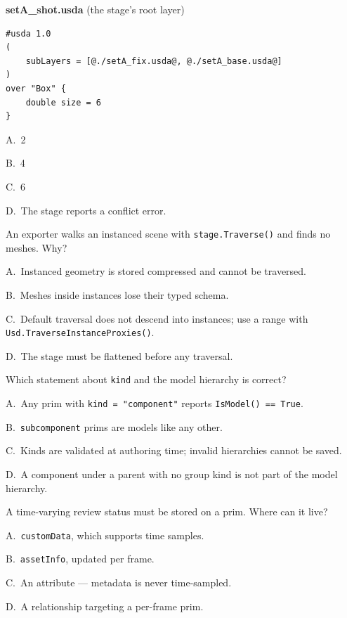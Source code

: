 \noindent\textbf{setA\_shot.usda} (the stage's root layer)
\begin{lstlisting}
#usda 1.0
(
    subLayers = [@./setA_fix.usda@, @./setA_base.usda@]
)
over "Box" {
    double size = 6
}
\end{lstlisting}

\begin{Choices}
  \item A.\ 2
  \item B.\ 4
  \item C.\ 6
  \item D.\ The stage reports a conflict error.
\end{Choices}

An exporter walks an instanced scene with \texttt{stage.Traverse()} and
finds no meshes. Why?
\begin{Choices}
  \item A.\ Instanced geometry is stored compressed and cannot be traversed.
  \item B.\ Meshes inside instances lose their typed schema.
  \item C.\ Default traversal does not descend into instances; use a range with \texttt{Usd.TraverseInstanceProxies()}.
  \item D.\ The stage must be flattened before any traversal.
\end{Choices}

Which statement about \texttt{kind} and the model hierarchy is correct?
\begin{Choices}
  \item A.\ Any prim with \texttt{kind = "component"} reports \texttt{IsModel() == True}.
  \item B.\ \texttt{subcomponent} prims are models like any other.
  \item C.\ Kinds are validated at authoring time; invalid hierarchies cannot be saved.
  \item D.\ A component under a parent with no group kind is not part of the model hierarchy.
\end{Choices}

A time-varying review status must be stored on a prim. Where can it live?
\begin{Choices}
  \item A.\ \texttt{customData}, which supports time samples.
  \item B.\ \texttt{assetInfo}, updated per frame.
  \item C.\ An attribute --- metadata is never time-sampled.
  \item D.\ A relationship targeting a per-frame prim.
\end{Choices}

